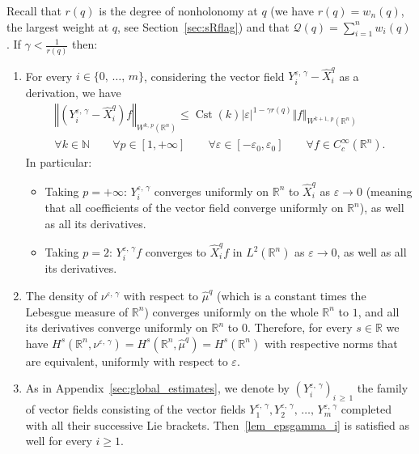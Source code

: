 \documentclass[AHL,Unicode,published]{cedram}
\newcommand*\R{\mathbb{R}}
\newcommand*\N{\mathbb{N}}
\newcommand{\calQ}{\mathcal{Q}}
\DeclareMathOperator{\Cst}{Cst}
\renewcommand{\geq}{\geqslant}
\renewcommand{\leq}{\leqslant}
\newcommand*{\romanenumi}{\renewcommand*{\theenumi}{\roman{enumi}}}
\let\oldforall\forall
\renewcommand*{\forall}{\mathrel{\oldforall}}
\begin{document}
\begin{lemm}\label{lem_epsgamma}
Recall that $r(q)$ is the degree of nonholonomy at $q$ (we have $r(q)=w_n(q)$, the largest weight at $q$, see Section~\ref{sec:sRflag}) and that $\calQ(q)=\sum_{i=1}^n w_i(q)$. If $\gamma < \frac{1}{r(q)}$ then:
\begin{enumerate}\romanenumi
\item\label{lem_epsgamma_i}
For every $i\in\{0,\,\ldots,\,m\}$, considering the vector field $Y_i^{\varepsilon,\,\gamma} - \widehat{X}_i^{q}$ as a derivation, we have
\begin{multline*}
\left\Vert \left(Y_i^{\varepsilon,\,\gamma} - \widehat{X}_i^{q}\right)f \right\Vert_{W^{k,\,p}(\R^n)} \leq \Cst(k) \vert\varepsilon\vert^{1-\gamma r(q)} \Vert f\Vert_{W^{k+1,\,p}(\R^n)}\\
\forall k\in\N\qquad \forall p\in[1,+\infty]\qquad \forall \varepsilon\in[-\varepsilon_0,\varepsilon_0] \qquad \forall f\in C_c^\infty(\R^n).
\end{multline*}
In particular:
\begin{itemize}
\item Taking $p=+\infty$: $Y_i^{\varepsilon,\,\gamma}$ converges uniformly on $\R^n$ to $\widehat{X}_i^{q}$ as $\varepsilon\rightarrow 0$ (meaning that all coefficients of the vector field converge uniformly on $\R^n$), as well as all its derivatives.
\item Taking $p=2$: $Y_i^{\varepsilon,\,\gamma}f$ converges to $\widehat{X}_i^{q}f$ in $L^2(\R^n)$ as $\varepsilon\rightarrow 0$, as well as all its derivatives.
\end{itemize}

\item\label{lem_epsgamma_ii}
The density of $\nu^{\varepsilon,\,\gamma}$ with respect to $\widehat{\mu}^{q}$ (which is a constant times the Lebesgue measure of $\R^n$) converges uniformly on the whole $\R^n$ to $1$, and all its derivatives converge uniformly on $\R^n$ to $0$. Therefore, for every $s\in \R$ we have $H^s(\R^n,\nu^{\varepsilon,\,\gamma}) = H^s(\R^n,\widehat{\mu}^{q}) = H^s(\R^n)$ with respective norms that are equivalent, uniformly with respect to $\varepsilon$.

\item\label{lem_epsgamma_iii}
As in Appendix~\ref{sec:global_estimates}, we denote by $(Y_i^{\varepsilon,\,\gamma})_{i\,\geq\,1}$ the family of vector fields consisting of the vector fields $Y_1^{\varepsilon,\,\gamma}, Y_2^{\varepsilon,\,\gamma},\,\ldots,\,Y_m^{\varepsilon,\,\gamma}$ completed with all their successive Lie brackets. Then~\eqref{lem_epsgamma_i} is satisfied as well for every $i\geq 1$.


\end{enumerate}
\end{lemm}
\end{document}
